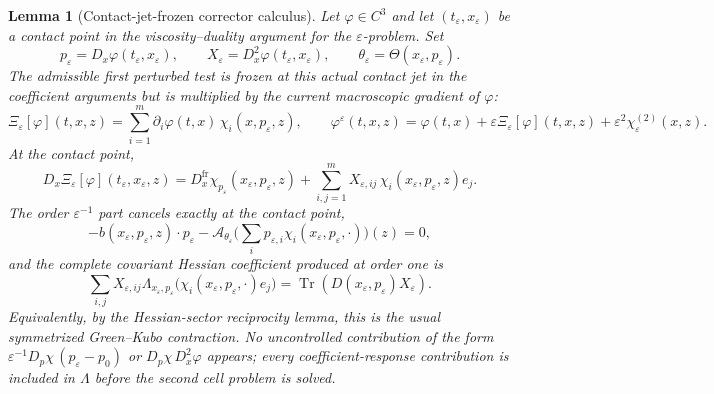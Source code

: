 \documentclass[12pt, letterpaper]{amsart}
\newcommand{\Acal}{\mathcal{A}}
\providecommand{\Tr}{\operatorname{Tr}}
\theoremstyle{plain}
\newtheorem{lemma}[theorem]{Lemma}
\theoremstyle{definition}
\theoremstyle{remark}
\begin{document}
\begin{lemma}[Contact-jet-frozen corrector calculus]
\label{lem:jet_frozen_corrector_calculus}
Let $\varphi\in C^3$ and let $(t_\varepsilon,x_\varepsilon)$ be a contact point
in the viscosity--duality argument for the $\varepsilon$-problem.  Set
\begin{equation}
    p_\varepsilon=D_x\varphi(t_\varepsilon,x_\varepsilon),
    \qquad
    X_\varepsilon=D_x^2\varphi(t_\varepsilon,x_\varepsilon),
    \qquad
    \theta_\varepsilon=\Theta(x_\varepsilon,p_\varepsilon).
\end{equation}
The admissible first perturbed test is frozen at this actual contact jet in the
coefficient arguments but is multiplied by the current macroscopic gradient of
$\varphi$:
\begin{equation}
\label{eq:jet_frozen_test}
    \Xi_\varepsilon[\varphi](t,x,z)
      =\sum_{i=1}^m \partial_i\varphi(t,x)\,\chi_i(x,p_\varepsilon,z),
    \qquad
    \varphi^\varepsilon(t,x,z)=\varphi(t,x)+\varepsilon\Xi_\varepsilon[\varphi](t,x,z)
      +\varepsilon^2\chi^{(2)}_{\varepsilon}(x,z).
\end{equation}
At the contact point,
\begin{equation}
\label{eq:contact_frozen_gradient_expansion}
    D_x\Xi_\varepsilon[\varphi](t_\varepsilon,x_\varepsilon,z)
    =D_x^{\mathrm{fr}}\chi_{p_\varepsilon}(x_\varepsilon,p_\varepsilon,z)
      +\sum_{i,j=1}^m X_{\varepsilon,ij}\,\chi_i(x_\varepsilon,p_\varepsilon,z)e_j .
\end{equation}
The order $\varepsilon^{-1}$ part cancels exactly at the contact point,
\begin{equation}
\label{eq:exact_contact_cancellation}
    -b(x_\varepsilon,p_\varepsilon,z)\cdot p_\varepsilon
    -\Acal_{\theta_\varepsilon}
      \Big(\sum_i p_{\varepsilon,i}\chi_i(x_\varepsilon,p_\varepsilon,\cdot)\Big)(z)=0,
\end{equation}
and the complete covariant Hessian coefficient produced at order one is
\begin{equation}
\label{eq:jet_frozen_second_coefficient}
    \sum_{i,j}X_{\varepsilon,ij}
      \Lambda_{x_\varepsilon,p_\varepsilon}
       \bigl(\chi_i(x_\varepsilon,p_\varepsilon,\cdot)e_j\bigr)
    =\Tr(D(x_\varepsilon,p_\varepsilon)X_\varepsilon).
\end{equation}
Equivalently, by the Hessian-sector reciprocity lemma, this is the usual
symmetrized Green--Kubo contraction.  No uncontrolled contribution of the form
$\varepsilon^{-1}D_p\chi\,(p_\varepsilon-p_0)$ or
$D_p\chi\,D_x^2\varphi$ appears; every coefficient-response contribution is
included in $\Lambda$ before the second cell problem is solved.
\end{lemma}
\end{document}
